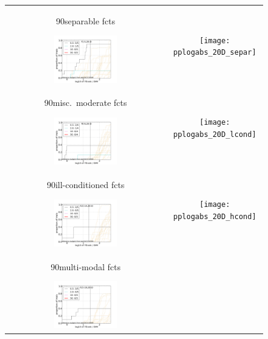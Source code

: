 \documentclass{article}
\newcommand{\rot}[2][2.5]{
  \hspace*{-3.5\baselineskip}%
  \begin{rotate}{90}\hspace{#1em}#2
  \end{rotate}}
\begin{document}
\begin{figure}[htbp!]
\centering
\begin{tabular}{@{}c@{}c@{}}
\rot[2.5]{separable fcts}
\includegraphics[width=0.41\textwidth,trim=0 7.5mm 16mm 11mm, clip]{pprldistr_20D_separ} &
\texttt{[image: pplogabs\_20D\_separ]}
\\[-1ex]
\rot[1.3]{misc.\ moderate fcts}
\includegraphics[width=0.41\textwidth,trim=0 7.5mm 16mm 11mm, clip]{pprldistr_20D_lcond} &
\texttt{[image: pplogabs\_20D\_lcond]}
\\[-1ex]
\rot[1.1]{ill-conditioned fcts}
\includegraphics[width=0.41\textwidth,trim=0 7.5mm 16mm 11mm, clip]{pprldistr_20D_hcond} &
\texttt{[image: pplogabs\_20D\_hcond]}
\\[-1ex]
\rot[1.7]{multi-modal fcts}
\includegraphics[width=0.41\textwidth,trim=0 7.5mm 16mm 11mm, clip]{pprldistr_20D_multi} &

\end{tabular}
\end{figure}
\end{document}
